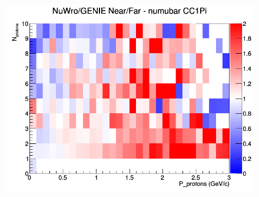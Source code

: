 \begin{figure}[h]
\endminipage
{}
\includegraphics[width=\linewidth]{N_P/nominal/protons/ratios/CC1Pi_NuWro_GENIE_numubar_NF_N_P.png}
\endminipage
\newline
\end{figure}
\clearpage
